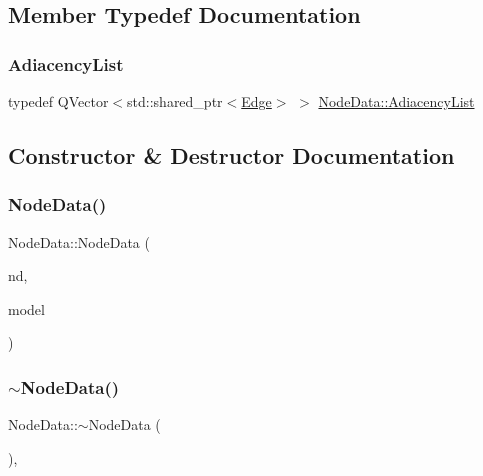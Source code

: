 \subsection{Member Typedef Documentation}
\mbox{\label{class_node_data_a18f3494d8d83ab4c6831ea211f4cbf09}} 
\subsubsection{\texorpdfstring{AdiacencyList}{AdiacencyList}}
{\footnotesize\ttfamily typedef Q\+Vector$<$std\+::shared\+\_\+ptr$<$\mbox{\hyperlink{struct_node_data_1_1_edge}{Edge}}$>$ $>$ \mbox{\hyperlink{class_node_data_a18f3494d8d83ab4c6831ea211f4cbf09}{Node\+Data\+::\+Adiacency\+List}}}



\subsection{Constructor \& Destructor Documentation}
\mbox{\label{class_node_data_a7a67b993f0da15663ef1b3ce61c9f8c3}} 
\subsubsection{\texorpdfstring{NodeData()}{NodeData()}}
{\footnotesize\ttfamily Node\+Data\+::\+Node\+Data (\begin{DoxyParamCaption}\item[{std\+::shared\+\_\+ptr$<$ \mbox{\hyperlink{class_node}{Node}} $>$}]{nd,  }\item[{\mbox{\hyperlink{class_displace_model}{Displace\+Model}} $\ast$}]{model }\end{DoxyParamCaption})\hspace{0.3cm}{\ttfamily [explicit]}}

\mbox{\label{class_node_data_ad870d466c40b9be96ad79adccab79038}} 
\subsubsection{\texorpdfstring{$\sim$NodeData()}{~NodeData()}}
{\footnotesize\ttfamily Node\+Data\+::$\sim$\+Node\+Data (\begin{DoxyParamCaption}{ }\end{DoxyParamCaption})\hspace{0.3cm}{\ttfamily [virtual]}, {\ttfamily [default]}}



